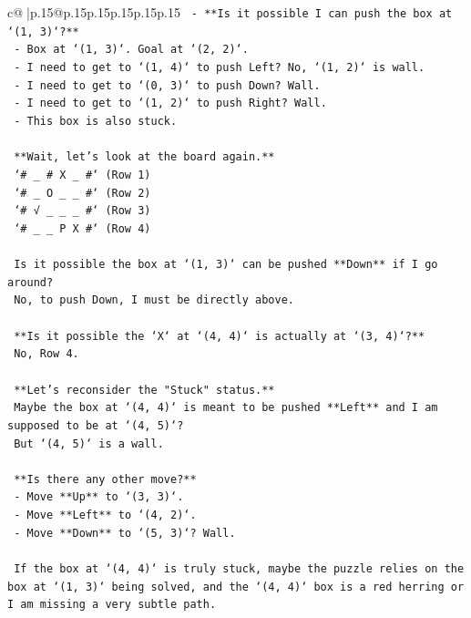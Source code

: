 \documentclass{article}
\begin{document}
{\begin{supertabular}{c@{$\;$}|p{.15\linewidth}@{}p{.15\linewidth}p{.15\linewidth}p{.15\linewidth}p{.15\linewidth}p{.15\linewidth}}
{{{\texttt{    {-} **Is it possible I can push the box at `(1, 3)`?**} \\
\texttt{      {-} Box at `(1, 3)`. Goal at `(2, 2)`.} \\
\texttt{      {-} I need to get to `(1, 4)` to push Left? No, `(1, 2)` is wall.} \\
\texttt{      {-} I need to get to `(0, 3)` to push Down? Wall.} \\
\texttt{      {-} I need to get to `(1, 2)` to push Right? Wall.} \\
\texttt{      {-} This box is also stuck.} \\
\\ 
\texttt{    **Wait, let's look at the board again.**} \\
\texttt{    `\# \_ \# X \_ \#` (Row 1)} \\
\texttt{    `\# \_ O \_ \_ \#` (Row 2)} \\
\texttt{    `\# √ \_ \_ \_ \#` (Row 3)} \\
\texttt{    `\# \_ \_ P X \#` (Row 4)} \\
\\ 
\texttt{    Is it possible the box at `(1, 3)` can be pushed **Down** if I go around?} \\
\texttt{    No, to push Down, I must be directly above.} \\
\\ 
\texttt{    **Is it possible the `X` at `(4, 4)` is actually at `(3, 4)`?**} \\
\texttt{    No, Row 4.} \\
\\ 
\texttt{    **Let's reconsider the "Stuck" status.**} \\
\texttt{    Maybe the box at `(4, 4)` is meant to be pushed **Left** and I am supposed to be at `(4, 5)`?} \\
\texttt{    But `(4, 5)` is a wall.} \\
\\ 
\texttt{    **Is there any other move?**} \\
\texttt{    {-} Move **Up** to `(3, 3)`.} \\
\texttt{    {-} Move **Left** to `(4, 2)`.} \\
\texttt{    {-} Move **Down** to `(5, 3)`? Wall.} \\
\\ 
\texttt{    If the box at `(4, 4)` is truly stuck, maybe the puzzle relies on the box at `(1, 3)` being solved, and the `(4, 4)` box is a red herring or I am missing a very subtle path.} \\
}}}
\end{supertabular}}
\end{document}
